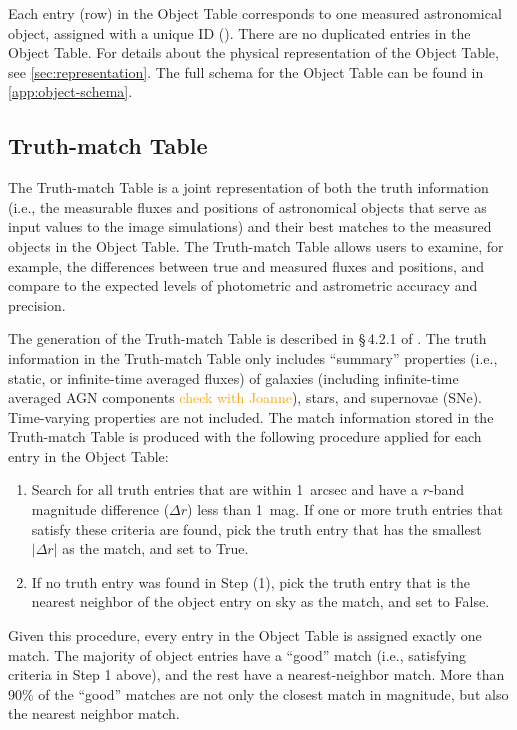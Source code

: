 \documentclass[modern]{descnote}
\newcommand{\todo}[1]{\textcolor{orange}{#1}}
\begin{document}
Each entry (row) in the Object Table corresponds to one measured astronomical object, assigned with a unique ID (). There are no duplicated entries in the Object Table. For details about the physical representation of the Object Table, see \autoref{sec:representation}. The full schema for the Object Table can be found in \autoref{app:object-schema}. 

\subsection{Truth-match Table}
\label{sec:truth}

The Truth-match Table is a joint representation of both the truth information (i.e., the measurable fluxes and positions of astronomical objects that serve as input values to the image simulations) and their best matches to the measured objects in the Object Table. The Truth-match Table allows users to examine, for example, the differences between true and measured fluxes and positions, and compare to the expected levels of photometric and astrometric accuracy and precision.

The generation of the Truth-match Table is described in \S\,4.2.1 of \cite{2020arXiv201005926L}. The truth information in the Truth-match Table only includes ``summary'' properties (i.e., static, or infinite-time averaged fluxes) of galaxies (including infinite-time averaged AGN components \todo{check with Joanne}), stars, and supernovae (SNe). Time-varying properties are not included. The match information stored in the  Truth-match Table is produced with the following procedure applied for each entry in the Object Table:
\begin{enumerate}
    \item Search for all truth entries that are within 1~arcsec and have a $r$-band magnitude difference ($\Delta r$) less than 1~mag. If one or more truth entries that satisfy these criteria are found, pick the truth entry that has the smallest $|\Delta r|$ as the match, and set  to True.
    \item If no truth entry was found in Step (1), pick the truth entry that is the nearest neighbor of the object entry on sky as the match, and set  to False.
\end{enumerate}
Given this procedure, every entry in the Object Table is assigned exactly one match. The majority of object entries have a ``good'' match (i.e., satisfying criteria in Step 1 above), and the rest have a nearest-neighbor match. More than 90\% of the ``good'' matches are not only the closest match in magnitude, but also the nearest neighbor match. 
\end{document}
